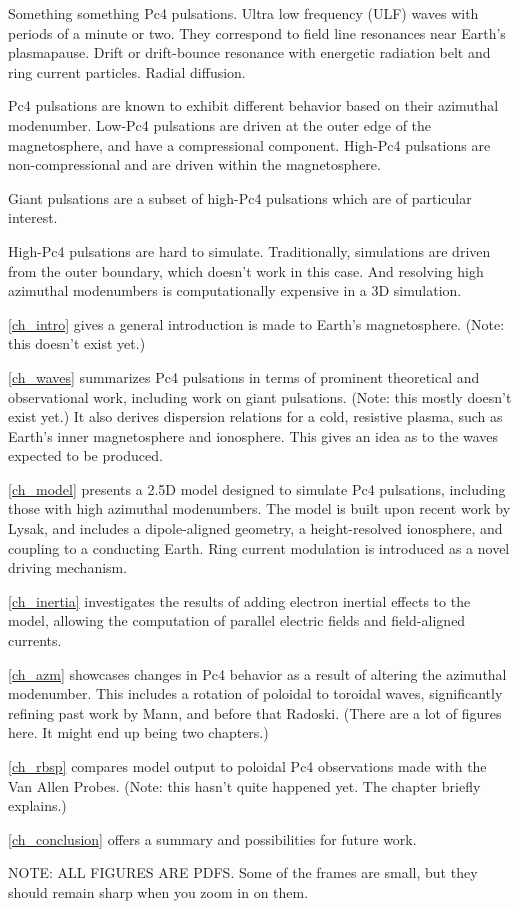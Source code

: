 
Something something Pc4 pulsations. Ultra low frequency (ULF) waves with periods of a minute or two. They correspond to field line resonances near Earth's plasmapause. Drift or drift-bounce resonance with energetic radiation belt and ring current particles. Radial diffusion. 

Pc4 pulsations are known to exhibit different behavior based on their azimuthal modenumber. Low-\azm Pc4 pulsations are driven at the outer edge of the magnetosphere, and have a compressional component. High-\azm Pc4 pulsations are non-compressional and are driven within the magnetosphere. 

Giant pulsations are a subset of high-\azm Pc4 pulsations which are of particular interest. 

High-\azm Pc4 pulsations are hard to simulate. Traditionally, simulations are driven from the outer boundary, which doesn't work in this case. And resolving high azimuthal modenumbers is computationally expensive in a 3D simulation. 

\cref{ch_intro} gives a general introduction is made to Earth's magnetosphere. (Note: this doesn't exist yet.)

\cref{ch_waves} summarizes Pc4 pulsations in terms of prominent theoretical and observational work, including work on giant pulsations. (Note: this mostly doesn't exist yet.) It also derives dispersion relations for a cold, resistive plasma, such as Earth's inner magnetosphere and ionosphere. This gives an idea as to the waves expected to be produced. 

\cref{ch_model} presents a 2.5D model designed to simulate Pc4 pulsations, including those with high azimuthal modenumbers. The model is built upon recent work by Lysak, and includes a dipole-aligned geometry, a height-resolved ionosphere, and coupling to a conducting Earth. Ring current modulation is introduced as a novel driving mechanism. 

\cref{ch_inertia} investigates the results of adding electron inertial effects to the model, allowing the computation of parallel electric fields and field-aligned currents. 

\cref{ch_azm} showcases changes in Pc4 behavior as a result of altering the azimuthal modenumber. This includes a rotation of poloidal to toroidal waves, significantly refining past work by Mann, and before that Radoski. (There are a lot of figures here. It might end up being two chapters.)

\cref{ch_rbsp} compares model output to poloidal Pc4 observations made with the Van Allen Probes. (Note: this hasn't quite happened yet. The chapter briefly explains.)

\cref{ch_conclusion} offers a summary and possibilities for future work. 

NOTE: ALL FIGURES ARE PDFS. Some of the frames are small, but they should remain sharp when you zoom in on them. 


